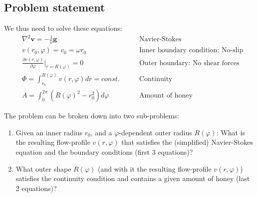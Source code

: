 \documentclass[11pt]{article}
\renewcommand{\vec}[1]{{\boldsymbol{#1}}}
\newcommand{\pdiff}[2]{{\frac{\partial {#1}}{\partial {#2}}}}
\begin{document}
    \subsection{Problem statement}
    We thus need to solve these equations:
    \begin{align}
        &\nabla^2 \vec{v} = -\frac{1}{\nu} \vec{g} \qquad &\text{Navier-Stokes}\\
        &v(r_0, \varphi) = v_0 = \omega r_0 \qquad &\text{Inner boundary condition: No-slip}\\
        &\pdiff{v(r,\varphi)}{\varphi}|_{r=R(\varphi)} = 0 \qquad &\text{Outer boundary: No shear forces}\\
        &\Phi = \int_{r_0}^{R(\varphi)} v(r, \varphi) dr = const. \qquad &\text{Continuity} \\
        &A = \int_0^{2\pi} \left( R(\varphi)^2 - r_0^2 \right) d\varphi \qquad &\text{Amount of honey}
    \end{align}

    The problem can be broken down into two sub-problems:
    \begin{enumerate}
        \item Given an inner radius $r_0$, and a $\varphi$-dependent outer radius $R(\varphi)$: What is the resulting flow-profile $v(r, \varphi)$ that satisfies the (simplified) Navier-Stokes equation and the boundary conditions (first 3 equations)?
        \item What outer shape $R(\varphi)$ (and with it the resulting flow-profile $v(r, \varphi)$) satisfies the continuity condition and contains a given amount of honey (last 2 equations)?
    \end{enumerate}

    
\end{document}
